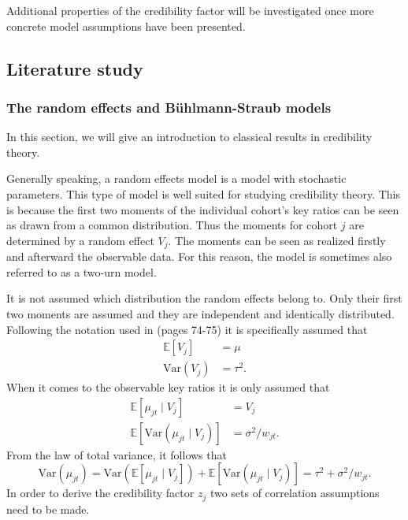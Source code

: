 \documentclass[11pt]{article}
\theoremstyle{definition}
\begin{document}
Additional properties of the credibility factor will be investigated once more concrete model assumptions have been presented.

\subsection{Literature study}
\subsubsection{The random effects and Bühlmann-Straub models}
In this section, we will give an introduction to classical results in credibility theory.

Generally speaking, a random effects model is a model with stochastic parameters. This type of model is well suited for studying credibility theory. This is because the first two moments of the individual cohort's key ratios can be seen as drawn from a common distribution. Thus the moments for cohort $j$ are determined by a random effect $V_j$. The moments can be seen as realized firstly and afterward the observable data. For this reason, the model is sometimes also referred to as a two-urn model.

It is not assumed which distribution the random effects belong to. Only their first two moments are assumed and they are independent and identically distributed. Following the notation used in \cite{esbjorn} (pages 74-75) it is specifically assumed that
\begin{equation}\label{eq:buhlmann_random_effect_moments}
    \begin{aligned}
        \mathds{E}[V_j] &= \mu  \\
        \text{Var}(V_j) &= \tau^2.
    \end{aligned}
\end{equation}
When it comes to the observable key ratios it is only assumed that
\begin{equation*}
\begin{aligned}
    \mathds{E}[\mu_{jt} \mid V_j] &= V_j \\
    \mathds{E}\left[\text{Var}(\mu_{jt}\mid V_j) \right] &= \sigma^2 / w_{jt}.
\end{aligned}
\end{equation*}
From the law of total variance, it follows that
\begin{equation}\label{eq:buhlmann_var_mujt}
    \text{Var}(\mu_{jt}) = \text{Var}\left( \mathds{E}[\mu_{jt}\mid V_j]\right) +  \mathds{E}\left[\text{Var}(\mu_{jt}\mid V_j) \right] = \tau^2 + \sigma^2/w_{jt}.
\end{equation}
In order to derive the credibility factor $z_j$ two sets of correlation assumptions need to be made. 
\end{document}
